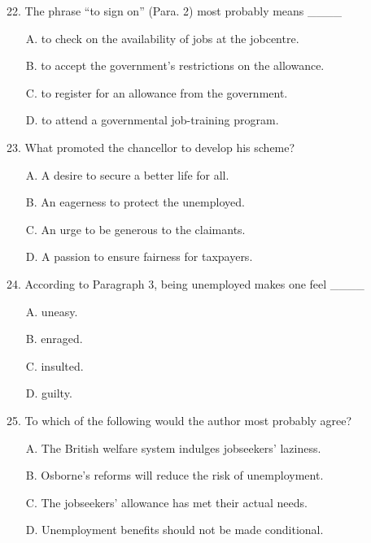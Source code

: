 \documentclass[UTF8,11pt]{ctexart}
\begin{document}
22. The phrase “to sign on” (Para. 2) most probably means \_\_\_\_


\begin{itemize}[leftmargin=2em,itemsep=.2em,topsep=.4em]\item[A.] to check on the availability of jobs at the jobcentre.
\item[B.] to accept the government’s restrictions on the allowance.
\item[C.] to register for an allowance from the government.
\item[D.] to attend a governmental job-training program.
\end{itemize}

23. What promoted the chancellor to develop his scheme?


\begin{itemize}[leftmargin=2em,itemsep=.2em,topsep=.4em]\item[A.] A desire to secure a better life for all.
\item[B.] An eagerness to protect the unemployed.
\item[C.] An urge to be generous to the claimants.
\item[D.] A passion to ensure fairness for taxpayers.
\end{itemize}

24. According to Paragraph 3, being unemployed makes one feel \_\_\_\_


\begin{itemize}[leftmargin=2em,itemsep=.2em,topsep=.4em]\item[A.] uneasy.
\item[B.] enraged.
\item[C.] insulted.
\item[D.] guilty.
\end{itemize}

25. To which of the following would the author most probably agree?


\begin{itemize}[leftmargin=2em,itemsep=.2em,topsep=.4em]\item[A.] The British welfare system indulges jobseekers’ laziness.
\item[B.] Osborne’s reforms will reduce the risk of unemployment.
\item[C.] The jobseekers’ allowance has met their actual needs.
\item[D.] Unemployment benefits should not be made conditional.
\end{itemize}
\end{document}

